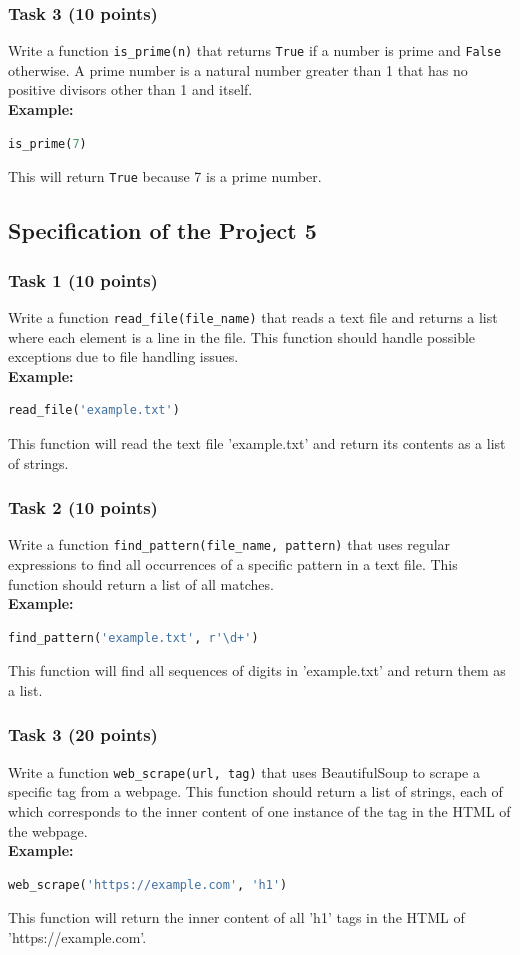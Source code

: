 \documentclass[12pt]{article}
\begin{document}
\subsubsection{Task 3 (10 points)}
Write a function \texttt{is\_prime(n)} that returns \texttt{True} if a number is prime and \texttt{False} otherwise. A prime number is a natural number greater than 1 that has no positive divisors other than 1 and itself. \\
\textbf{Example:}
\begin{lstlisting}[language=Python]
is_prime(7)
\end{lstlisting}
This will return \texttt{True} because 7 is a prime number.

\newpage
\subsection{Specification of the Project 5}

\subsubsection{Task 1 (10 points)}
Write a function \texttt{read\_file(file\_name)} that reads a text file and returns a list where each element is a line in the file. This function should handle possible exceptions due to file handling issues. \\
\textbf{Example:}
\begin{lstlisting}[language=Python]
read_file('example.txt')
\end{lstlisting}
This function will read the text file 'example.txt' and return its contents as a list of strings.

\subsubsection{Task 2 (10 points)}
Write a function \texttt{find\_pattern(file\_name, pattern)} that uses regular expressions to find all occurrences of a specific pattern in a text file. This function should return a list of all matches. \\
\textbf{Example:}
\begin{lstlisting}[language=Python]
find_pattern('example.txt', r'\d+')
\end{lstlisting}
This function will find all sequences of digits in 'example.txt' and return them as a list.

\subsubsection{Task 3 (20 points)}
Write a function \texttt{web\_scrape(url, tag)} that uses BeautifulSoup to scrape a specific tag from a webpage. This function should return a list of strings, each of which corresponds to the inner content of one instance of the tag in the HTML of the webpage. \\
\textbf{Example:}
\begin{lstlisting}[language=Python]
web_scrape('https://example.com', 'h1')
\end{lstlisting}
This function will return the inner content of all 'h1' tags in the HTML of 'https://example.com'.
\newpage
\end{document}
